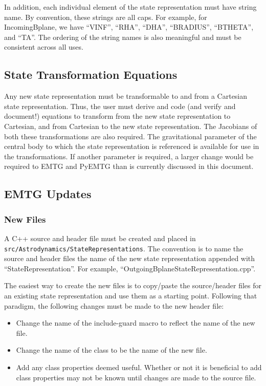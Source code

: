 \documentclass[11pt]{article}
\begin{document}
In addition, each individual element of the state representation must have string name. By convention, these strings are all caps. For example, for IncomingBplane, we have ``VINF'', ``RHA'', ``DHA'', ``BRADIUS'', ``BTHETA'', and ``TA''. The ordering of the string names is also meaningful and must be consistent across all uses.

\subsection{State Transformation Equations}
\label{subsec:stateTransformationEquations}

Any new state representation must be transformable to and from a Cartesian state representation. Thus, the user must derive and code (and verify and document!) equations to transform from the new state representation to Cartesian, and from Cartesian to the new state representation. The Jacobians of both these transformations are also required. The gravitational parameter of the central body to which the state representation is referenced is available for use in the transformations. If another parameter is required, a larger change would be required to EMTG and PyEMTG than is currently discussed in this document.

\subsection{EMTG Updates}
\label{subsec:emtgUpdates}

\subsubsection{New Files}
\label{subsubsec:newEmtgFiles}

A C++ source and header file must be created and placed in \texttt{src/Astrodynamics/StateRepresentations}. The convention is to name the source and header files the name of the new state representation appended with ``StateRepresentation''. For example, ``OutgoingBplaneStateRepresentation.cpp''.

The easiest way to create the new files is to copy/paste the source/header files for an existing state representation and use them as a starting point. Following that paradigm, the following changes must be made to the new header file:

\begin{itemize}
	\item Change the name of the include-guard macro to reflect the name of the new file.
	\item Change the name of the class to be the name of the new file.
	\item Add any class properties deemed useful. Whether or not it is beneficial to add class properties may not be known until changes are made to the source file.
\end{itemize}
\end{document}
